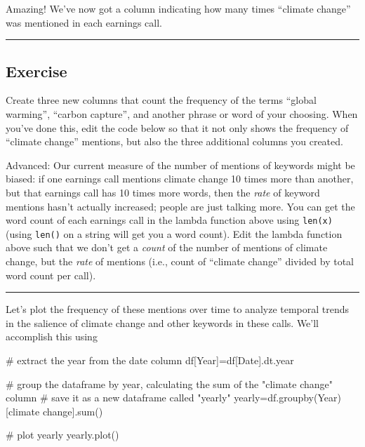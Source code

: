 \documentclass[
  letterpaper,
  DIV=11,
  numbers=noendperiod]{scrreprt}
\newenvironment{Shaded}{\begin{snugshade}}{\end{snugshade}}
\newcommand{\BuiltInTok}[1]{\textcolor[rgb]{0.00,0.23,0.31}{#1}}
\newcommand{\CommentTok}[1]{\textcolor[rgb]{0.37,0.37,0.37}{#1}}
\newcommand{\NormalTok}[1]{\textcolor[rgb]{0.00,0.23,0.31}{#1}}
\newcommand{\OperatorTok}[1]{\textcolor[rgb]{0.37,0.37,0.37}{#1}}
\newcommand{\StringTok}[1]{\textcolor[rgb]{0.13,0.47,0.30}{#1}}
\begin{document}
Amazing! We've now got a column indicating how many times ``climate
change'' was mentioned in each earnings call.

\begin{center}\rule{0.5\linewidth}{0.5pt}\end{center}

\hypertarget{exercise-10}{%
\subsection{Exercise}\label{exercise-10}}

Create three new columns that count the frequency of the terms ``global
warming'', ``carbon capture'', and another phrase or word of your
choosing. When you've done this, edit the code below so that it not only
shows the frequency of ``climate change'' mentions, but also the three
additional columns you created.

Advanced: Our current measure of the number of mentions of keywords
might be biased: if one earnings call mentions climate change 10 times
more than another, but that earnings call has 10 times more words, then
the \emph{rate} of keyword mentions hasn't actually increased; people
are just talking more. You can get the word count of each earnings call
in the lambda function above using \texttt{len(x)} (using \texttt{len()}
on a string will get you a word count). Edit the lambda function above
such that we don't get a \emph{count} of the number of mentions of
climate change, but the \emph{rate} of mentions (i.e., count of
``climate change'' divided by total word count per call).

\begin{center}\rule{0.5\linewidth}{0.5pt}\end{center}

Let's plot the frequency of these mentions over time to analyze temporal
trends in the salience of climate change and other keywords in these
calls. We'll accomplish this using

\begin{Shaded}
\begin{Highlighting}[]
\CommentTok{\# extract the year from the date column }
\NormalTok{df[}\StringTok{\textquotesingle{}Year\textquotesingle{}}\NormalTok{]}\OperatorTok{=}\NormalTok{df[}\StringTok{\textquotesingle{}Date\textquotesingle{}}\NormalTok{].dt.year}

\CommentTok{\# group the dataframe by year, calculating the sum of the "climate change" column}
\CommentTok{\# save it as a new dataframe called "yearly"}
\NormalTok{yearly}\OperatorTok{=}\NormalTok{df.groupby(}\StringTok{\textquotesingle{}Year\textquotesingle{}}\NormalTok{)[}\StringTok{\textquotesingle{}climate change\textquotesingle{}}\NormalTok{].}\BuiltInTok{sum}\NormalTok{()}

\CommentTok{\# plot yearly}
\NormalTok{yearly.plot()}
\end{Highlighting}
\end{Shaded}
\end{document}
